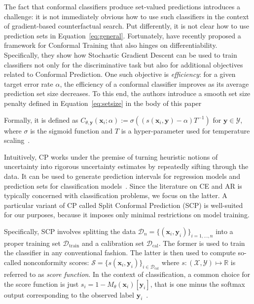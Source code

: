 \documentclass{article}
\begin{document}
The fact that conformal classifiers produce set-valued predictions introduces a challenge: it is not immediately obvious how to use such classifiers in the context of gradient-based counterfactual search. Put differently, it is not clear how to use prediction sets in Equation~\ref{eq:general}. Fortunately, \citet{stutz2022learning} have recently proposed a framework for Conformal Training that also hinges on differentiability. Specifically, they show how Stochastic Gradient Descent can be used to train classifiers not only for the discriminative task but also for additional objectives related to Conformal Prediction. One such objective is \textit{efficiency}: for a given target error rate $\alpha$, the efficiency of a conformal classifier improves as its average prediction set size decreases. To this end, the authors introduce a smooth set size penalty defined in Equation~\ref{eq:setsize} in the body of this paper

Formally, it is defined as $C_{\theta,\mathbf{y}}(\mathbf{x}_i;\alpha):=\sigma\left((s(\mathbf{x}_i,\mathbf{y})-\alpha) T^{-1}\right)$ for $\mathbf{y}\in\mathcal{Y}$, where $\sigma$ is the sigmoid function and $T$ is a hyper-parameter used for temperature scaling~\citep{stutz2022learning}.

Intuitively, CP works under the premise of turning heuristic notions of uncertainty into rigorous uncertainty estimates by repeatedly sifting through the data. It can be used to generate prediction intervals for regression models and prediction sets for classification models~\citep{altmeyer2022conformal}. Since the literature on CE and AR is typically concerned with classification problems, we focus on the latter. A particular variant of CP called Split Conformal Prediction (SCP) is well-suited for our purposes, because it imposes only minimal restrictions on model training. 

Specifically, SCP involves splitting the data $\mathcal{D}_n=\{(\mathbf{x}_i,\mathbf{y}_i)\}_{i=1,...,n}$ into a proper training set $\mathcal{D}_{\text{train}}$ and a calibration set $\mathcal{D}_{\text{cal}}$. The former is used to train the classifier in any conventional fashion. The latter is then used to compute so-called nonconformity scores: $\mathcal{S}=\{s(\mathbf{x}_i,\mathbf{y}_i)\}_{i \in \mathcal{D}_{\text{cal}}}$ where $s: (\mathcal{X},\mathcal{Y}) \mapsto \mathbb{R}$ is referred to as \textit{score function}. In the context of classification, a common choice for the score function is just $s_i=1-M_{\theta}(\mathbf{x}_i)[\mathbf{y}_i]$, that is one minus the softmax output corresponding to the observed label $\mathbf{y}_i$~\citep{angelopoulos2021gentle}. 
\end{document}
